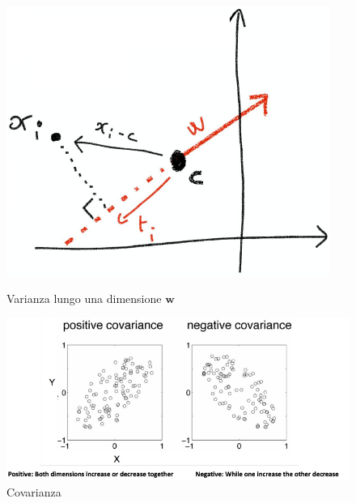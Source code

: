\begin{figure}
	\centering
	\begin{minipage}{.5\textwidth}
		\centering
		\includegraphics[width=0.6\linewidth]{imgs/chapter12/img1}
		\caption{Varianza lungo una dimensione $\mathbf{w}$}
		\label{fig:chapter12-01}
	\end{minipage}%
	\begin{minipage}{.5\textwidth}
		\centering
		\includegraphics[width=1\linewidth]{imgs/chapter12/img2}
		\caption{Covarianza}
		\label{fig:chapter12-02}
	\end{minipage}
\end{figure}

